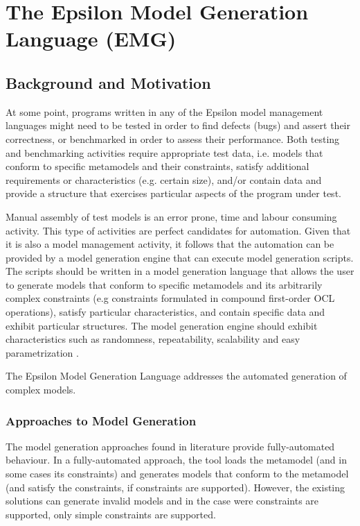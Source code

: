 \chapter{The Epsilon Model Generation Language (EMG)}
\label{sec:EMG}

\section{Background and Motivation}
At some point, programs written in any of the Epsilon model management languages might need to be tested in order to find defects (bugs) and assert their correctness, or benchmarked in order to assess their performance.
Both testing and benchmarking activities require appropriate test data, i.e. models that conform to specific metamodels and their constraints, satisfy additional requirements or characteristics (e.g. certain size), and/or contain data and provide a structure that exercises particular aspects of the program under test.

Manual assembly of test models is an error prone, time and labour consuming activity. This type of activities are perfect candidates for automation. Given that it is also a model management activity, it follows that the automation can be provided by a model generation engine that can execute model generation scripts. 
The scripts should be written in a model generation language that allows the user to generate models that conform to specific metamodels and its arbitrarily complex constraints (e.g constraints formulated in compound first-order OCL operations), satisfy particular characteristics, and contain specific data and exhibit particular structures. The model generation engine should exhibit characteristics such as randomness, repeatability, scalability and easy parametrization \cite{Baudry2010,Ferdjoukh2015}.

The Epsilon Model Generation Language  addresses the automated generation of complex models. 

\subsection{Approaches to Model Generation}

The model generation approaches found in literature provide fully-automated behaviour. In a fully-automated approach, the tool loads the metamodel (and in some cases its constraints) and generates models that conform to the metamodel (and satisfy the constraints, if constraints are supported).  However, the existing solutions can generate invalid models and in the case were constraints are supported, only simple constraints are supported.

